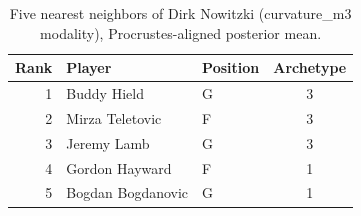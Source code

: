 \begin{table}[htbp]
  \centering\small
  \begin{tabular}{rllc}
    \toprule
    Rank & Player & Position & Archetype \\
    \midrule
    1 & Buddy Hield & G & 3 \\
    2 & Mirza Teletovic & F & 3 \\
    3 & Jeremy Lamb & G & 3 \\
    4 & Gordon Hayward & F & 1 \\
    5 & Bogdan Bogdanovic & G & 1 \\
    \bottomrule
  \end{tabular}
  \caption{Five nearest neighbors of Dirk Nowitzki (curvature_m3 modality), Procrustes-aligned posterior mean.}
  \label{tab:Dirk_Nowitzki_neighbors_curvature_m3}
\end{table}

